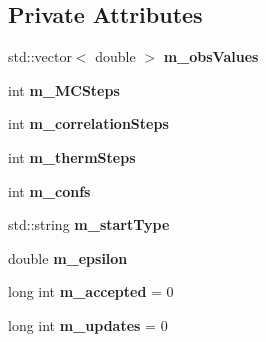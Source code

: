 \subsection*{Private Attributes}
\begin{DoxyCompactItemize}
\item 
std\+::vector$<$ double $>$ {\bfseries m\+\_\+obs\+Values}\hypertarget{classGaugeFieldFactory_ab6d5d1f77e9731709899bf68a13d6b66}{}\label{classGaugeFieldFactory_ab6d5d1f77e9731709899bf68a13d6b66}

\item 
int {\bfseries m\+\_\+\+M\+C\+Steps}\hypertarget{classGaugeFieldFactory_acdb2e28a0996b989e90507aeaa779358}{}\label{classGaugeFieldFactory_acdb2e28a0996b989e90507aeaa779358}

\item 
int {\bfseries m\+\_\+correlation\+Steps}\hypertarget{classGaugeFieldFactory_a4766228f02c8e75b98c36d9b3231a13d}{}\label{classGaugeFieldFactory_a4766228f02c8e75b98c36d9b3231a13d}

\item 
int {\bfseries m\+\_\+therm\+Steps}\hypertarget{classGaugeFieldFactory_aa4426a1d60452c4882556224262ab447}{}\label{classGaugeFieldFactory_aa4426a1d60452c4882556224262ab447}

\item 
int {\bfseries m\+\_\+confs}\hypertarget{classGaugeFieldFactory_a08f5104224cb00356243d3a7deee1331}{}\label{classGaugeFieldFactory_a08f5104224cb00356243d3a7deee1331}

\item 
std\+::string {\bfseries m\+\_\+start\+Type}\hypertarget{classGaugeFieldFactory_a270a1a8e7995761b26d41cf2217fd180}{}\label{classGaugeFieldFactory_a270a1a8e7995761b26d41cf2217fd180}

\item 
double {\bfseries m\+\_\+epsilon}\hypertarget{classGaugeFieldFactory_a615f5d961e3326339a6e39d11c1fffea}{}\label{classGaugeFieldFactory_a615f5d961e3326339a6e39d11c1fffea}

\item 
long int {\bfseries m\+\_\+accepted} = 0\hypertarget{classGaugeFieldFactory_ae1910e40b9471b9722e6392d1f4665cc}{}\label{classGaugeFieldFactory_ae1910e40b9471b9722e6392d1f4665cc}

\item 
long int {\bfseries m\+\_\+updates} = 0\hypertarget{classGaugeFieldFactory_a4e1118e49b8ead095c6ceead1a337943}{}\label{classGaugeFieldFactory_a4e1118e49b8ead095c6ceead1a337943}


\end{DoxyCompactItemize}
